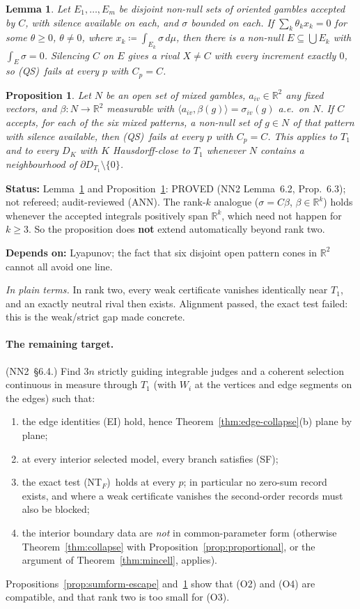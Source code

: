 \documentclass[11pt]{article}
\newtheorem{lemma}[theorem]{Lemma}
\newtheorem{proposition}[theorem]{Proposition}
\theoremstyle{definition}
\theoremstyle{remark}
\newcommand{\R}{\mathbb R}
\newcommand{\src}[1]{\textsf{#1}}
\newcommand{\status}[1]{\par\smallskip\noindent\textbf{Status:} #1\par}
\newcommand{\deps}[1]{\noindent\textbf{Depends on:} #1\par}
\newcommand{\inwords}[1]{\noindent\textit{In plain terms.} #1\par\smallskip}
\newcommand{\QS}{\textup{(QS)}}
\newcommand{\NT}{\textup{(NT$_F$)}}
\begin{document}
\begin{lemma}\label{lem:zerosum}
Let $E_1,\dots,E_m$ be disjoint non-null sets of oriented gambles accepted by $C$, with silence available on each, and $\sigma$ bounded on each. If $\sum_k\theta_kx_k=0$ for some $\theta\ge0$, $\theta\ne0$, where $x_k\coloneqq\int_{E_k}\sigma\,d\mu$, then there is a non-null $E\subseteq\bigcup E_k$ with $\int_E\sigma=0$. Silencing $C$ on $E$ gives a rival $X\ne C$ with every increment exactly $0$, so \QS\ fails at every $p$ with $C_p=C$.
\end{lemma}
\begin{proposition}\label{prop:rank2fail}
Let $N$ be an open set of mixed gambles, $a_{iv}\in\R^2$ \emph{any} fixed vectors, and $\beta:N\to\R^2$ measurable with $\langle a_{iv},\beta(g)\rangle=\sigma_{iv}(g)$ a.e.\ on $N$. If $C$ accepts, for each of the six mixed patterns, a non-null set of $g\in N$ of that pattern with silence available, then \QS\ fails at every $p$ with $C_p=C$. This applies to $T_1$ and to every $D_K$ with $K$ Hausdorff-close to $T_1$ whenever $N$ contains a neighbourhood of $\partial D_{T_1}\setminus\{0\}$.
\end{proposition}
\status{Lemma~\ref{lem:zerosum} and Proposition~\ref{prop:rank2fail}: PROVED (\src{NN2} Lemma~6.2, Prop.~6.3); not refereed; audit-reviewed (\src{ANN}). The rank-$k$ analogue ($\sigma=C\beta$, $\beta\in\R^k$) holds whenever the accepted integrals positively span $\R^k$, which need not happen for $k\ge3$. So the proposition does \textbf{not} extend automatically beyond rank two.}
\deps{Lyapunov; the fact that six disjoint open pattern cones in $\R^2$ cannot all avoid one line.}
\inwords{In rank two, every weak certificate vanishes identically near $T_1$, and an exactly neutral rival then exists. Alignment passed, the exact test failed: this is the weak/strict gap made concrete.}

\paragraph{The remaining target.} (\src{NN2}~\S6.4.) Find $3n$ strictly guiding integrable judges and a coherent selection continuous in measure through $T_1$ (with $W_i$ at the vertices and edge segments on the edges) such that:
\begin{enumerate}[label=(O\arabic*),leftmargin=*]
\item the edge identities (EI) hold, hence Theorem~\ref{thm:edge-collapse}(b) plane by plane;
\item at every interior selected model, every branch satisfies (SF);
\item the exact test \NT\ holds at every $p$; in particular no zero-sum record exists, and where a weak certificate vanishes the second-order records must also be blocked;
\item the interior boundary data are \emph{not} in common-parameter form (otherwise Theorem~\ref{thm:collapse} with Proposition~\ref{prop:proportional}, or the argument of Theorem~\ref{thm:mincell}, applies).
\end{enumerate}
Propositions~\ref{prop:sumform-escape} and~\ref{prop:rank2fail} show that (O2) and (O4) are compatible, and that rank two is too small for (O3).
\end{document}
